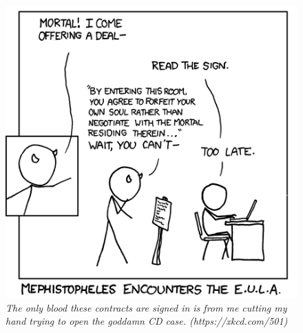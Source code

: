 \begin{figure}[b!]
\centering
\includegraphics[scale=.55]{img/xkcd/eula_faust_20.png}
\caption*{{\small \textit{The only blood these contracts are signed in is from me cutting my hand trying to open the goddamn CD case. (https://xkcd.com/501)}}}
\end{figure}


